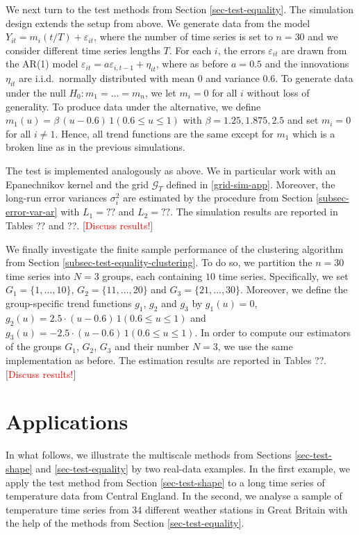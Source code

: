 We next turn to the test methods from Section \ref{sec-test-equality}. The simulation design extends the setup from above. We generate data from the model $Y_{it} = m_i(t/T) + \varepsilon_{it}$, where the number of time series is set to $n = 30$ and we consider different time series lengths $T$. For each $i$, the errors $\varepsilon_{it}$ are drawn from the AR(1) model $\varepsilon_{it} = a \varepsilon_{i,t-1} + \eta_{it}$, where as before $a = 0.5$ and the innovations $\eta_{it}$ are i.i.d.\ normally distributed with mean $0$ and variance $0.6$. To generate data under the null $H_0: m_1 = \ldots = m_n$, we let $m_i = 0$ for all $i$ without loss of generality. To produce data under the alternative, we define $m_1(u) = \beta \, (u - 0.6) \, 1(0.6 \le u \le 1)$ with $\beta = 1.25, 1.875, 2.5$ and set $m_i = 0$ for all $i \ne 1$. Hence, all trend functions are the same except for $m_1$ which is a broken line as in the previous simulations. 


The test is implemented analogously as above. We in particular work with an Epanechnikov kernel and the grid $\mathcal{G}_T$ defined in \eqref{grid-sim-app}. Moreover, the long-run error variances $\sigma_i^2$ are estimated by the procedure from Section \ref{subsec-error-var-ar} with $L_1 = ??$ and $L_2 = ??$. The simulation results are reported in Tables ?? and ??. [\textcolor{red}{Discuss results!}]


We finally investigate the finite sample performance of the clustering algorithm from Section \ref{subsec-test-equality-clustering}. To do so, we partition the $n = 30$ time series into $N=3$ groups, each containing $10$ time series. Specifically, we set $G_1 = \{1,\ldots,10\}$, $G_2 = \{11,\ldots,20\}$ and $G_3 =  \{21,\ldots,30\}$. Moreover, we define the group-specific trend functions $g_1$, $g_2$ and $g_3$ by $g_1(u) = 0$, $g_2(u) =  2.5 \cdot (u - 0.6) \, 1(0.6 \le u \le 1)$ and $g_3(u) =  -2.5 \cdot (u - 0.6) \, 1(0.6 \le u \le 1)$. In order to compute our estimators of the groups $G_1$, $G_2$, $G_3$ and their number $N = 3$, we use the same implementation as before. The estimation results are reported in Tables ??. [\textcolor{red}{Discuss results!}]   



\section{Applications}\label{sec-data}


In what follows, we illustrate the multiscale methods from Sections \ref{sec-test-shape} and \ref{sec-test-equality} by two real-data examples. In the first example, we apply the test method from Section \ref{sec-test-shape} to a long time series of temperature data from Central England. In the second, we analyse a sample of temperature time series from 34 different weather stations in Great Britain with the help of the methods from Section \ref{sec-test-equality}. 



